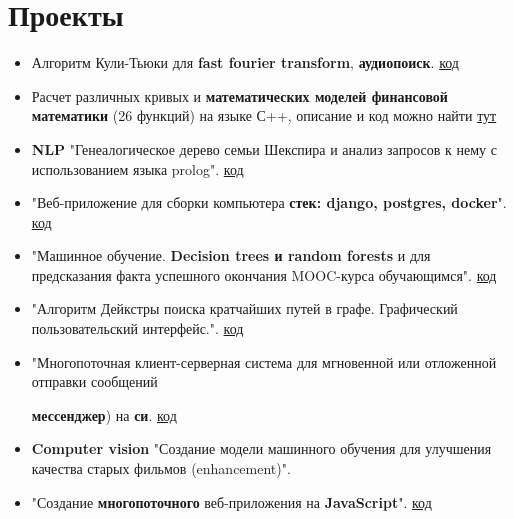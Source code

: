 \documentclass[a4paper,10pt]{report}
\begin{document}
\section{Проекты}
\begin{itemize}
    \item Алгоритм Кули-Тьюки для \textbf{fast fourier transform}, \textbf{аудиопоиск}. \href{https://github.com/Suraba03/DA_MAI/tree/main/CP}{код}
    
    \item Расчет различных кривых и \textbf{математических моделей финансовой математики} (26 функций) на языке С++, описание и код можно найти \href{https://github.com/Suraba03/quantaton-2022-preparation}{тут}

    \item \textbf{NLP} "Генеалогическое дерево семьи Шекспира и анализ запросов к нему с использованием языка prolog". \href{https://github.com/Suraba03/LP/tree/main/cp}{код}

    \item "Веб-приложение для сборки компьютера \textbf{стек: django, postgres, docker}". \href{https://github.com/Leha-Slava-Max-Kirill/computer_workshop}{код}
    
    \item "Машинное обучение. \textbf{Decision trees и random forests} и  для предсказания факта успешного окончания MOOC-курса обучающимся". \href{https://github.com/Suraba03/mini_ML_project_sem1}{код}
    
    \item "Алгоритм Дейкстры поиска кратчайших путей в графе. Графический пользовательский интерфейс.". \href{https://github.com/Suraba03/mai_prooga_sem2/tree/main/cp_dm_Dijkstra}{код}
    
    \item "Многопоточная клиент-серверная система для мгновенной или отложенной отправки сообщений 
    
    \textbf{мессенджер}) на \textbf{си}. \href{https://github.com/Suraba03/OS_MAI/tree/main/cp}{код}
    \item \textbf{Computer vision} "Создание модели машинного обучения для улучшения качества старых фильмов (enhancement)".
    
    \item "Создание \textbf{многопоточного} веб-приложения на \textbf{JavaScript}". \href{https://github.com/Leha-Slava-Max-Kirill/application}{код}

\end{itemize}
\end{document}
